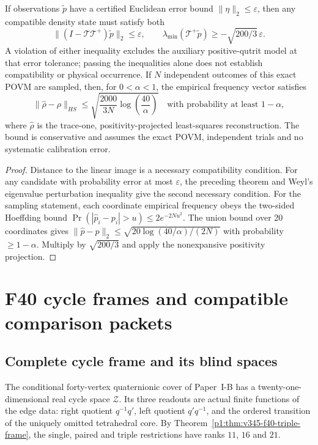 \documentclass[12pt,a4paper]{article}
\begin{document}
\begin{corollary}
\label{p2c:cor:cc16-tomography-incompatibility}
If observations $\tilde p$ have a certified Euclidean error bound
$\|\eta\|_2\le\varepsilon$, then any compatible density state must
satisfy both
\[
 \|(I-\mathcal T\mathcal T^+)\tilde p\|_2\le\varepsilon,
 \qquad \lambda_{\min}(\mathcal T^+\tilde p)
 \ge-\sqrt{200/3}\,\varepsilon.
\]
A violation of either inequality excludes the auxiliary
positive-qutrit model at that error tolerance; passing the
inequalities alone does not establish compatibility or physical
occurrence. If $N$ independent outcomes of this exact POVM are sampled,
then, for $0<\alpha<1$, the empirical frequency vector satisfies
\[
 \boxed{\|\hat\rho-\rho\|_{HS}
 \le\sqrt{\frac{2000}{3N}\log\!\left(\frac{40}{\alpha}\right)}}
 \quad\text{with probability at least }1-\alpha,
\]
where $\hat\rho$ is the trace-one, positivity-projected least-squares
reconstruction. The bound is conservative and assumes the exact
POVM, independent trials and no systematic calibration error.
\end{corollary}
\begin{proof}
Distance to the linear image is a necessary compatibility condition.
For any candidate with probability error at most $\varepsilon$, the
preceding theorem and Weyl's eigenvalue perturbation inequality give
the second necessary condition. For the sampling statement, each
coordinate empirical frequency obeys the two-sided Hoeffding bound
$\Pr(|\hat p_i-p_i|>u)\le2e^{-2Nu^2}$.
The union bound over 20 coordinates gives
$\|\hat p-p\|_2\le\sqrt{20\log(40/\alpha)/(2N)}$ with probability
$\ge1-\alpha$. Multiply by $\sqrt{200/3}$ and apply the
nonexpansive positivity projection.
\end{proof}


\section{F40 cycle frames and compatible comparison packets}
\subsection{Complete cycle frame and its blind spaces}
\label{p2:sec:v345-f40-observable-frame}
The conditional forty-vertex quaternionic cover of Paper~I-B
has a twenty-one-dimensional real cycle space $\mathcal Z$.
Its three readouts are actual finite functions of the edge data:
right quotient $q^{-1}q'$, left quotient $q'q^{-1}$, and the
ordered transition of the uniquely omitted tetrahedral core.
By Theorem~\ref{p1:thm:v345-f40-triple-frame}, the single,
paired and triple restrictions have ranks $11$, $16$ and $21$.
\end{document}
